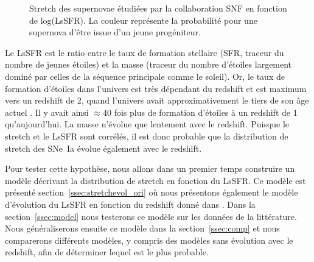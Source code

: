 \documentclass[a4paper, 12pt, svgnames]{article}
\begin{document}
\begin{figure}[htbp!]
    \centering
    \captionsetup{justification=centering}
    \caption{Stretch des supernovae étudiées par la collaboration SNF en
    fonction de log(LsSFR). La couleur représente la probabilité pour une
supernova d'être issue d'un jeune progéniteur.}
\end{figure}

Le LsSFR est le ratio entre le taux de formation stellaire (SFR, traceur du
nombre de jeunes étoiles) et la masse (traceur du nombre d'étoiles largement
dominé par celles de la séquence principale comme le soleil). Or, le taux de
formation d'étoiles dans l'univers est très dépendant du redshift et est maximum
vers un redshift de 2, quand l'univers avait approximativement le tiers de son
âge actuel \cite{madau_cosmic_2014}. Il y avait ainsi $\approx40$ fois plus de
formation d'étoiles à un redshift de 1 qu'aujourd'hui. La masse n'évolue que
lentement avec le redshift. Puisque le stretch et le LsSFR sont corrélés, il est
donc probable que la distribution de stretch des SNe~Ia évolue également avec le
redshift. \bigbreak

Pour tester cette hypothèse, nous allons dans un premier temps construire un
modèle décrivant la distribution de stretch en fonction du LsSFR. Ce modèle est
présenté section~\ref{ssec:stretchevol_ori} où nous présentons également le
modèle d'évolution du LsSFR en fonction du redshift donné dans
\cite{rigault_strong_2018}. Dans la section~\ref{ssec:model} nous testerons ce
modèle sur les données de la littérature. Nous généraliserons ensuite ce modèle
dans la section~\ref{ssec:comp} et nous comparerons différents modèles, y
compris des modèles sans évolution avec le redshift, afin de déterminer lequel
est le plus probable.
\end{document}
